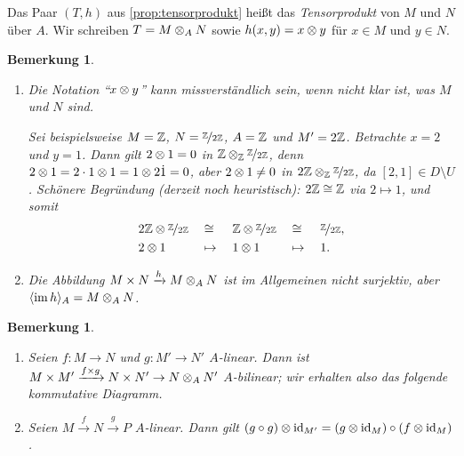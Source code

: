 \documentclass[12pt,a4paper]{scrartcl}
\theoremstyle{cplain}
\theoremstyle{cdef}
\newtheorem{beme}[thmcounter]{Bemerkung}
\begin{document}
\begin{defi}
	Das Paar $(T,h)$ aus \cref{prop:tensorprodukt} heißt das \emph{Tensorprodukt} von $M$ und $N$ über $A$. Wir schreiben $T = M \otimes_A  N$ sowie $h(x,y) = x \otimes y$ für $x \in M$ und $y \in N$.
\end{defi}
\begin{beme}
	\leavevmode
	\begin{enumerate}
		\item Die Notation \enquote{$x \otimes y$} kann missverständlich sein, wenn nicht klar ist, was $M$ und $N$ sind.

		Sei beispielsweise $M=\mathbb Z$, $N= \nicefrac{\mathbb Z}{2\mathbb Z}$, $A = \mathbb Z$ und $M' = 2 \mathbb Z$. Betrachte $x=2$ und $y=1$. Dann gilt $2 \otimes 1 = 0$ in $\mathbb Z \otimes_\mathbb Z \nicefrac{\mathbb Z}{2\mathbb Z}$, denn $2 \otimes 1 = 2 \cdot 1 \otimes 1 = 1 \otimes 2 \dot 1 = 0$, aber $2 \otimes 1 \neq 0$ in $2\mathbb Z \otimes_\mathbb Z \nicefrac{\mathbb Z}{2 \mathbb Z}$, da $[2,1] \in D \setminus U$. Schönere Begründung (derzeit noch heuristisch): $2\mathbb Z \cong \mathbb Z$ via $2 \mapsto 1$, und somit
		\begin{alignat*}{5}
			&2\mathbb Z \otimes \nicefrac{\mathbb Z}{2\mathbb Z} &&\cong &&\mathbb Z \otimes \nicefrac{\mathbb Z}{2\mathbb Z} &&\cong &&\nicefrac{\mathbb Z}{2\mathbb Z}, \\
			&2 \otimes 1 &&\mapsto\; &&1 \otimes 1 &&\mapsto\; &&1.
		\end{alignat*}
		\item Die Abbildung $M \times N \xrightarrow{h} M \otimes_A N$ ist im Allgemeinen nicht surjektiv, aber $\langle\operatorname{im} h\rangle_A = M \otimes_A N$.
	\end{enumerate}
\end{beme}
\begin{beme}
	\leavevmode
	\begin{enumerate}
		\item Seien $f\colon M \to N$ und $g\colon M' \to N'$ $A$-linear. Dann ist $M \times M' \xrightarrow{f \times g} N \times N' \to N \otimes_A N'$ $A$-bilinear; wir erhalten also das folgende kommutative Diagramm.
		\begin{center}
		\end{center}
		\item Seien $M \xrightarrow{f} N \xrightarrow{g} P$ $A$-linear. Dann gilt $(g \circ g) \otimes \operatorname{id}_{M'} = (g \otimes \operatorname{id}_{M}) \circ (f \otimes \operatorname{id}_{M})$.
	\end{enumerate}
\end{beme}
\end{document}
